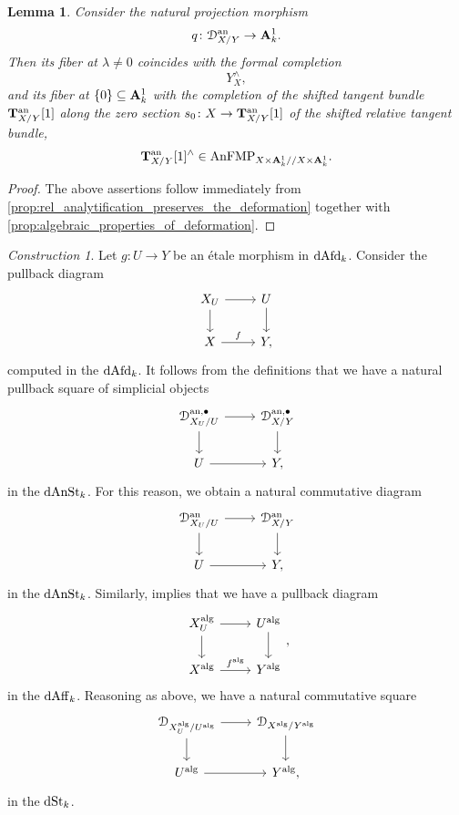 \documentclass[10pt,a4paper,reqno]{amsart} %
\theoremstyle{plain}
\newtheorem{lem}[thm]{Lemma}
\theoremstyle{definition}
\theoremstyle{remark}
\numberwithin{equation}{section}
\newtheorem{construction}[thm]{Construction}
\begin{document}
\begin{lem} \label{lem:identification_of_non-archimedean_fibers}
    Consider the natural projection morphism
        \[
            q \colon \mathcal D_{X/ Y}^\mathrm{an} \to \mathbf A^1_k.
        \]
    Then its fiber at $\lambda \neq 0$ coincides with the formal completion
        \[
            Y^\wedge_X,  
        \]
    and its fiber at $\{ 0 \} \subseteq \mathbf A^1_k$ with the completion of the shifted tangent bundle $\mathbf T^\mathrm{an}_{X/ Y}[1]$ along the zero section $s_0 \colon X \to \mathbf T^\mathrm{an}_{X/ Y}[1]$ of the shifted relative tangent bundle,
        \[
            \mathbf T^\mathrm{an}_{X/ Y} [1]^{\wedge} \in \mathrm{AnFMP}_{X \times \mathbf A^1_k/ /X \times \mathbf A^1_k}.
        \]
\end{lem}

\begin{proof}
    The above assertions follow immediately from \cref{prop:rel_analytification_preserves_the_deformation} together with \cref{prop:algebraic_properties_of_deformation}.
\end{proof}


\begin{construction} \label{const:pullbacks_of_deformations}
    Let $g \colon U \to Y$ be an \'etale morphism in $\mathrm{dAfd}_k$. Consider the pullback diagram
        \[
        \begin{tikzcd}
            X_U \ar{r} \ar{d} & U \ar{d} \\
            X \ar{r}{f} & Y,  
        \end{tikzcd}
        \]
    computed in the \infcat $\mathrm{dAfd}_k$. It follows from the definitions that we have a natural pullback square of simplicial objects
        \[
        \begin{tikzcd}
            \cD_{X_U/ U}^{\mathrm{an}, \bullet} \ar{r} \ar{d} & \cD_{X/Y}^{\mathrm{an}, \bullet} \ar{d} \\
            U \ar{r} & Y,
        \end{tikzcd}
        \]
    in the \infcat $\mathrm{dAnSt}_k$. For this reason, we obtain a natural commutative diagram
        \[
        \begin{tikzcd}
            \cD_{X_U/ U}\an \ar{r} \ar{d} & \cD_{X/ Y} \an \ar{d} \\
            U \ar{r} & Y,
        \end{tikzcd}
        \]
    in the \infcat $\mathrm{dAnSt}_k$. Similarly, \cite[Proposition 3.17]{Porta_Yu_Derived_non-archimedean_analytic_spaces}
    implies that we have a pullback diagram
        \[
        \begin{tikzcd}
            X_U\alg \ar{r} \ar{d} & U \alg \ar{d} \\
            X\alg \ar{r}{f\alg} & Y\alg
        \end{tikzcd},
        \]
    in the \infcat $\mathrm{dAff}_k$. Reasoning as above, we have a natural commutative square
      \[
        \begin{tikzcd}
        \cD_{X_U\alg/ U\alg} \ar{r} \ar{d} & \cD_{X\alg/ Y\alg} \ar{d} \\
        U\alg \ar{r} & Y \alg,  
       \end{tikzcd}
      \]
    in the \infcat $\mathrm{dSt}_k$.
\end{construction}
\end{document}
